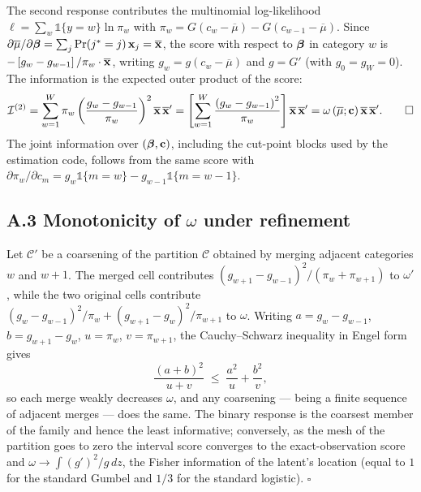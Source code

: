 \documentclass[
  letterpaper,
  DIV=11,
  numbers=noendperiod]{scrartcl}
\theoremstyle{plain}
\theoremstyle{plain}
\theoremstyle{remark}
\begin{document}
The second response contributes the multinomial log-likelihood
\(\ell = \sum_w \mathbb{1}\lbrace y = w \rbrace \ln \pi_w\) with
\(\pi_w = G(c_w - \overline{\mu}) - G(c_{w-1} - \overline{\mu})\). Since
\(\partial \overline{\mu} / \partial \boldsymbol{\beta} = \sum_j \Pr(j^* = j) \, \mathbf{x}_j = \overline{\mathbf{x}}\),
the score with respect to \(\boldsymbol{\beta}\) in category \(w\) is
\(- \left[ g_w - g_{w-1} \right] / \pi_w \cdot \overline{\mathbf{x}}\), writing
\(g_w = g \left( c_w - \overline{\mu} \right)\) and \(g = G'\) (with
\(g_0 = g_W = 0\)). The information is the expected outer product of the
score: \[
\mathcal{I}^{(2)} = \sum_{w=1}^{W} \pi_w \left( \frac{g_w - g_{w-1}}{\pi_w} \right)^2 \overline{\mathbf{x}} \, \overline{\mathbf{x}}'
= \left[ \sum_{w=1}^{W} \frac{ \left( g_w - g_{w-1} \right)^2 }{ \pi_w } \right] \overline{\mathbf{x}} \, \overline{\mathbf{x}}'
= \omega \left( \overline{\mu}; \mathbf{c} \right) \overline{\mathbf{x}} \, \overline{\mathbf{x}}'. \qquad \square
\] The joint information over \(\left( \boldsymbol{\beta}, \mathbf{c} \right)\),
including the cut-point blocks used by the estimation code, follows from
the same score with
\(\partial \pi_w / \partial c_m = g_w \mathbb{1}\lbrace m = w \rbrace - g_{w-1} \mathbb{1}\lbrace m = w-1 \rbrace\).

\subsection*{\texorpdfstring{A.3 Monotonicity of \(\omega\) under
refinement}{A.3 Monotonicity of \textbackslash omega under refinement}}\label{a.3-monotonicity-of-omega-under-refinement}

Let \(\mathcal{C}'\) be a coarsening of the partition \(\mathcal{C}\)
obtained by merging adjacent categories \(w\) and \(w+1\). The merged
cell contributes
\(\left( g_{w+1} - g_{w-1} \right)^2 / \left( \pi_w + \pi_{w+1} \right)\)
to \(\omega'\), while the two original cells contribute
\(\left( g_w - g_{w-1} \right)^2 / \pi_w + \left( g_{w+1} - g_w \right)^2 / \pi_{w+1}\)
to \(\omega\). Writing \(a = g_w - g_{w-1}\), \(b = g_{w+1} - g_w\),
\(u = \pi_w\), \(v = \pi_{w+1}\), the Cauchy--Schwarz inequality in
Engel form gives \[
\frac{(a + b)^2}{u + v} \;\le\; \frac{a^2}{u} + \frac{b^2}{v},
\] so each merge weakly decreases \(\omega\), and any coarsening ---
being a finite sequence of adjacent merges --- does the same. The binary
response is the coarsest member of the family and hence the least
informative; conversely, as the mesh of the partition goes to zero the
interval score converges to the exact-observation score and
\(\omega \to \int \left( g' \right)^2 / g \, dz\), the Fisher
information of the latent's location (equal to \(1\) for the standard
Gumbel and \(1/3\) for the standard logistic). \(\square\)
\end{document}
